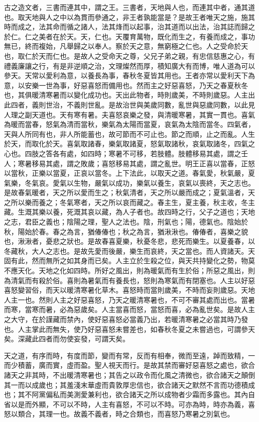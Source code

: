 古之造文者，三書而連其中，謂之王。三書者，天地與人也，而連其中者，通其道也。取天地與人之中以為貫而參通之，非王者孰能當是？是故王者唯天之施，施其時而成之，法其命而循之諸人，法其烽而以起事，治其道而以出法，治其誌而歸之於仁。仁之美者在於天。天，仁也。天覆育萬物，既化而生之，有養而成之，事功無已，終而複始，凡舉歸之以奉人。察於天之意，無窮極之仁也。人之受命於天也，取仁於天而仁也。是故人之受命天之尊，父兄子弟之親，有忠信慈惠之心，有禮義廉讓之行，有是非逆順之治，文理燦然而厚，積知廣大有而博，唯人道為可以參天。天常以愛利為意，以養長為事，春秋冬夏皆其用也。王者亦常以愛利天下為意，以安樂一世為事，好惡喜怒而備用也。然而主之好惡喜怒，乃天之春夏秋冬也，其俱暖清寒暑而以變化成功也。天出此物者，時則歲美，不時則歲惡。人主出此四者，義則世治，不義則世亂。是故治世與美歲同數，亂世與惡歲同數，以此見人理之副天道也。天有寒有暑。夫喜怒哀樂之發，與清暖寒暑，其實一貫也。喜氣為暖而當春，怒氣為清而當秋，樂氣為太陽而當夏，哀氣為太陰而當冬。四氣者，天與人所同有也，非人所能蓄也，故可節而不可止也。節之而順，止之而亂。人生於天，而取化於天。喜氣取諸春，樂氣取諸夏，怒氣取諸秋，哀氣取諸冬，四氣之心也。四肢之答各有處，如四時；寒暑不可移，若肢體。肢體移易其處，謂之壬人；寒暑移易其處，謂之敗歲；喜怒移易其處，謂之亂世。明王正喜以當春，正怒以當秋，正樂以當夏，正哀以當冬。上下法此，以取天之道。春氣愛，秋氣嚴，夏氣樂，冬氣哀。愛氣以生物，嚴氣以成功，樂氣以養生，哀氣以喪終，天之志也。是故春氣暖者，天之所以愛而生之；秋氣清者，天之所以嚴而成之；夏氣溫者，天之所以樂而養之；冬氣寒者，天之所以哀而藏之。春主生，夏主養，秋主收，冬主藏。生溉其樂以養，死溉其哀以藏，為人子者也。故四時之行，父子之道也；天地之志，君臣之義也；陰陽之理，聖人之法也。陰，刑氣也；陽，德氣也。陰始於秋，陽始於春。春之為言，猶偆偆也；秋之為言，猶湫湫也。偆偆者，喜樂之貌也，湫湫者，憂悲之狀也。是故春喜夏樂，秋憂冬悲，悲死而樂生。以夏養春，以冬藏秋，大人之志也。是故先愛而後嚴，樂生而哀終，天之當也。而人資諸天。天固有此，然而無所之如其身而已矣。人主立於生殺之位，與天共持變化之勢，物莫不應天化。天地之化如四時。所好之風出，則為暖氣而有生於俗；所惡之風出，則為清氣而有殺於俗。喜則為暑氣而有養長也，怒則為寒氣而有閉塞也。人主以好惡喜怒變習俗，而天以暖清寒暑化草木。喜怒時而當則歲美，不時而妄則歲惡。天地人主一也。然則人主之好惡喜怒，乃天之暖清寒暑也，不可不審其處而出也。當暑而寒，當寒而暑，必為惡歲矣。人主當喜而怒，當怒而喜，必為亂世矣。是故人主之大守，在於謹藏而禁內，使好惡喜怒必當義乃出，若暖清寒暑之必當其時乃發也。人主掌此而無失，使乃好惡喜怒未嘗差也，如春秋冬夏之未嘗過也，可謂參天矣。深藏此四者而勿使妄發，可謂天矣。


天之道，有序而時，有度而節，變而有常，反而有相奉，微而至遠，踔而致精，一而少積蓄，廣而實，虛而盈。聖人視天而行。是故其禁而審好惡喜怒之處也，欲合諸天之非其時，不出暖清寒暑也；其告之以政令而化風之清微也，欲合諸天之顛倒其一而以成歲也；其羞淺末華虛而貴敦厚忠信也，欲合諸天之默然不言而功德積成也；其不阿黨偏私而美測愛兼利也，欲合諸天之所以成物者少霜而多露也。其內自省以是而外顯，不可以不時，人主有喜怒，不可以不時。可亦為時，時亦為義，喜怒以類合，其理一也。故義不義者，時之合類也，而喜怒乃寒暑之別氣也。

